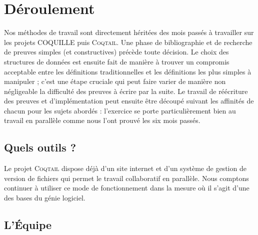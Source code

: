 \documentclass[11pt]{article}
\newcommand{\coqtail}{\textsc{Coqtail}}
\newcommand{\coquille}{\textsc{Coquille}}
\begin{document}
\section{Déroulement}

Nos méthodes de travail sont directement héritées des mois passés à travailler sur les projets COQUILLE puis \coqtail{}. Une phase de bibliographie et de recherche de preuves simples (et constructives) précède toute décision. Le choix des structures de données est ensuite fait de manière à trouver un compromis acceptable entre les définitions traditionnelles et les définitions les plus simples à manipuler ; c'est une étape cruciale qui peut faire varier de manière non négligeable la difficulté des preuves à écrire par la suite. Le travail de réécriture des preuves et d'implémentation peut ensuite être découpé suivant les affinités de chacun pour les sujets abordés : l'exercice se porte particulièrement bien au travail en parallèle comme nous l'ont prouvé les six mois passés.

\subsection{Quels outils ?}

Le projet \coqtail{} dispose déjà d'un site internet\cite{coqtail} et d'un système de gestion de version de fichiers qui permet le travail collaboratif en parallèle. Nous comptons continuer à utiliser ce mode de fonctionnement dans la mesure où il s'agit d'une des bases du génie logiciel. 





\subsection{L'Équipe}
\end{document}
